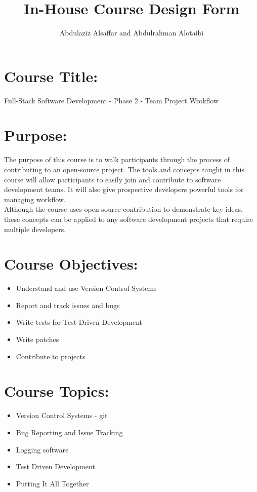 \documentclass[a4paper,11pt]{article}
\author{Abdulaziz Alsa{f}far and Abdulrahman Alotaibi}
\title{In-House Course Design Form}
\begin{document}
\maketitle
\pagestyle{plain}
\setcounter{page}{1}

\section{Course Title:}
Full-Stack Software Development - Phase 2 - Team Project Wrokflow

\section{Purpose:}
The purpose of this course is to walk participants through the process of contributing to an open-source project.
The tools and concepts taught in this course will allow participants to easily join and contribute to software development teams. It will also give prospective developers powerful tools for managing workflow.\\
Although the course uses open-source contribution to demonstrate key ideas, these concepts can be applied to any software development projects that require multiple developers.

\section{Course Objectives:}
\begin{itemize}
	\item Understand and use Version Control Systems
	\item Report and track issues and bugs
	\item Write tests for Test Driven Development
	\item Write patches
	\item Contribute to projects
\end{itemize}

\section{Course Topics:}
\begin{itemize}
	\item Version Control Systems - git
	\item Bug Reporting and Issue Tracking
	\item Logging software
	\item Test Driven Development
	\item Putting It All Together
\end{itemize}
\end{document}
